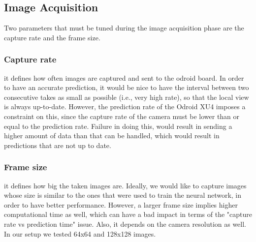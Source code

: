 \documentclass[10pt,conference,compsocconf]{IEEEtran}
\begin{document}
\subsection{Image Acquisition}
Two parameters that must be tuned during the image acquisition phase are the capture rate and the frame size.
\subsubsection{Capture rate} it defines how often images are captured and sent to the odroid board. In order to have an accurate prediction, it would be nice to have the interval between two consecutive takes as small as possible (i.e., very high rate), so that the local view is always up-to-date.
However, the prediction rate of the Odroid XU4 imposes a constraint on this, since the capture rate of the camera must be lower than or equal to the prediction rate. Failure in doing this, would result in sending a higher amount of data than that can be handled, which would result in predictions that are not up to date.
\subsubsection{Frame size} it defines how big the taken images are. Ideally, we would like to capture images whose size is similar to the ones that were used to train the neural network, in order to have better performance. However, a larger frame size implies higher computational time as well, which can have a bad impact in terms of the "capture rate vs prediction time" issue. Also, it depends on the camera resolution as well.
In our setup we tested 64x64 and 128x128 images.
\end{document}
